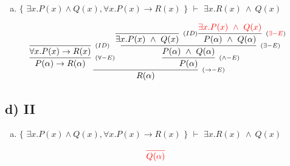\documentclass[aspectratio=43]{beamer}
\begin{document}
    \begin{frame}[fragile]
    
    	\begin{enumerate}[d)]
			\item $\{$ $\exists x.P(x)\land Q(x), \forall x.P(x)\to R(x)$ $\}$ $\vdash$ $\exists x.R(x)\ \land\ Q(x) $\\
		\end{enumerate}
        
        \vspace{65pt}
        
        \[
        \begin{array}{c}
		
        	\infer[_{(\to -E)}]
            	{R(\alpha)}
            	{\infer[_{(\forall -E)}]
                	{P(\alpha) \rightarrow R(\alpha)} 
                    {\infer[_{(ID)}]
                    	{\forall x.P(x)\to R(x)}
                    	{}
                    }  
            	\infer[_{(\land -E)}] 
                	{P(\alpha)}
                    {\infer[_{(\exists -E)}]
                    	{P(\alpha)\ \land \ Q(\alpha)}
                    	{\infer[_{(ID)}]
                        	{\exists x.P(x)\ \land \ Q(x)}
                            {}
                        \infer[_{(\textcolor{red}{\exists -E})}] 
                        	{P(\alpha)\ \land \ Q(\alpha)}
                            {\textcolor{red}{\exists x.P(x)\ \land \ Q(x)}}
                        }
                    }
                }
		\end{array}
        \]
        
	\end{frame}
    
  
    \subsection{d) II}
    
    \begin{frame}[fragile]
    
    	\begin{enumerate}[d)]
			\item $\{$ $\exists x.P(x)\land Q(x), \forall x.P(x)\to R(x)$ $\}$ $\vdash$ $\exists x.R(x)\ \land\ Q(x) $\\
		\end{enumerate}
        
        \vspace{75pt}
        
        \[
        \begin{array}{c}
		
        	\textcolor{red}{
            \infer[_{}]
            	{Q(\alpha)}
            	{}
        	}
		\end{array}
        \]
        
	\end{frame}
    
\end{document}
